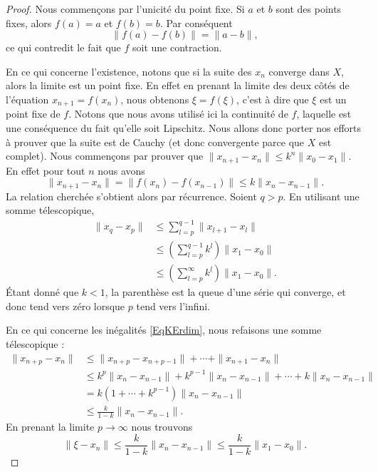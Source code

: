 \begin{proof}
    
    Nous commençons par l'unicité du point fixe. Si \( a\) et \( b\) sont des points fixes, alors \( f(a)=a\) et \( f(b)=b\). Par conséquent
    \begin{equation}
        \| f(a)-f(b) \|=\| a-b \|,
    \end{equation}
    ce qui contredit le fait que \( f\) soit une contraction.

    En ce qui concerne l'existence, notons que si la suite des \( x_n\) converge dans \( X\), alors la limite est un point fixe. En effet en prenant la limite des deux côtés de l'équation \( x_{n+1}=f(x_n)\), nous obtenons \( \xi=f(\xi)\), c'est à dire que \( \xi\) est un point fixe de \( f\). Notons que nous avons utilisé ici la continuité de \( f\), laquelle est une conséquence du fait qu'elle soit Lipschitz. Nous allons donc porter nos efforts à prouver que la suite est de Cauchy (et donc convergente parce que \( X\) est complet). Nous commençons par prouver que \( \| x_{n+1}-x_n \|\leq k^n\| x_0-x_1 \|\). En effet pour tout \( n\) nous avons
    \begin{equation}
        \| x_{n+1}-x_n \|=\| f(x_n)-f(x_{n-1}) \|\leq k\| x_n-x_{n-1} \|.
    \end{equation}
    La relation cherchée s'obtient alors par récurrence. Soient \( q>p\). En utilisant une somme télescopique,
    \begin{subequations}
        \begin{align}
            \| x_q-x_p \|&\leq \sum_{l=p}^{q-1}\| x_{l+1}-x_l \|\\
            &\leq\left( \sum_{l=p}^{q-1}k^l \right)\| x_1-x_0 \|\\
            &\leq\left(\sum_{l=p}^{\infty}k^l\right)\| x_1-x_0 \|.
        \end{align}
    \end{subequations}
    Étant donné que \( k<1\), la parenthèse est la queue d'une série qui converge, et donc tend vers zéro lorsque \( p\) tend vers l'infini.

    En ce qui concerne les inégalités \eqref{EqKErdim}, nous refaisons une somme télescopique :
    \begin{subequations}
        \begin{align}
            \| x_{n+p}-x_n \|&\leq \| x_{n+p}-x_{n+p-1} \|+\cdots +\| x_{n+1}-x_n \|\\
            &\leq k^p\| x_n-x_{n-1} \|+k^{p-1}\| x_n-x_{n-1} \|+\cdots +k\| x_n-x_{n-1} \|\\
            &=k(1+\cdots +k^{p-1})\| x_n-x_{n-1}\|  \\
            &\leq \frac{ k }{ 1-k }\| x_n-x_{n-1} \|.
        \end{align}
    \end{subequations}
    En prenant la limite \( p\to \infty\) nous trouvons
    \begin{equation}        \label{EqlUMVGW}
        \| \xi-x_n \|\leq \frac{ k }{ 1-k }\| x_n-x_{n-1} \|\leq \frac{ k }{ 1-k }\| x_1-x_0 \|.
    \end{equation}


\end{proof}

